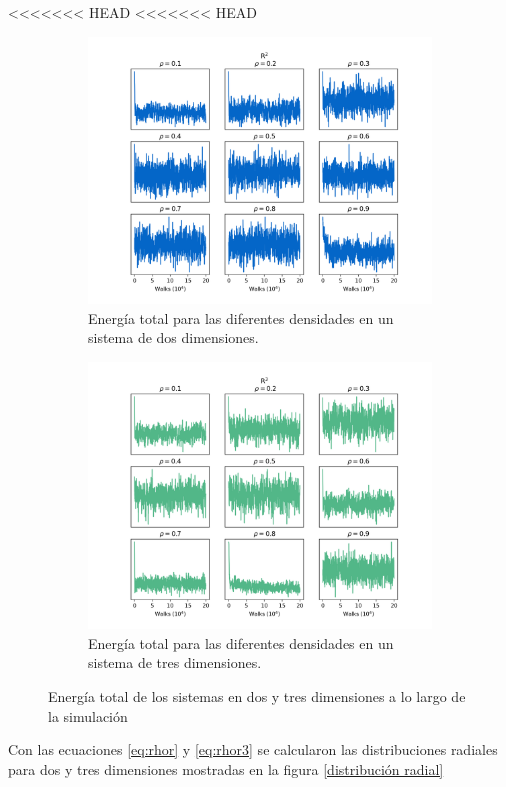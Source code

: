 \documentclass[reprint,amsmath,amssymb,aps,]{revtex4-2}
\begin{document}
<<<<<<< HEAD
<<<<<<< HEAD
\begin{figure}[H]
    \centering
    \begin{subfigure}[b]{\linewidth}
    \includegraphics[scale=0.34]{../Graphics/Energy_2.png}
    \caption{Energía total para las diferentes densidades en un sistema de dos dimensiones.}
    \end{subfigure}
    \begin{subfigure}[b]{\linewidth}
        \includegraphics[scale=0.34]{../Graphics/Energy_3.png}
        \caption{Energía total para las diferentes densidades en un sistema de tres dimensiones.}
    \end{subfigure}
    \caption{Energía total de los sistemas en dos y tres dimensiones a lo largo de la simulación}
    \label{energias}
\end{figure}
Con las ecuaciones \ref{eq:rhor} y \ref{eq:rhor3} se calcularon las distribuciones radiales para dos y tres dimensiones mostradas en la figura \ref{distribución radial}
\end{document}
